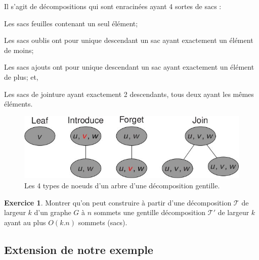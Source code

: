 \documentclass[a4paper,12pt]{article}
\theoremstyle{definition}
\newtheorem{exo}{Exercice}%
\theoremstyle{remark}
\begin{document}
Il s'agit de décompositions qui sont enracinées ayant 4 sortes de sacs :
\begin{compactitem}
\item Les sacs feuilles contenant un seul élément;
\item Les sacs oublis ont pour unique descendant un sac ayant exactement un
  élément de moins;
\item Les sacs ajouts ont pour unique descendant un sac ayant
  exactement un élément de plus; et,
\item Les sacs de jointure ayant exactement 2 descendants, tous deux
  ayant les mêmes éléments.
\end{compactitem}
\begin{figure}[h]
  \centering
  \includegraphics[width=.7\textwidth]{dessins/NiceDecompositions.jpg}
  \caption{Les 4 types de noeuds d'un arbre d'une décomposition gentille.}
\end{figure}
\begin{exo}
  Montrer qu'on peut construire à partir d'une décomposition $\mathcal{T}$ de
  largeur $k$ d'un graphe $G$ à $n$ sommets une gentille décomposition $\mathcal{T}'$
  de largeur $k$ ayant au plus $O(k.n)$ sommets (sacs).
\end{exo}

\subsection*{Extension de notre exemple}
\label{sec:extension-de-notre}
\end{document}
